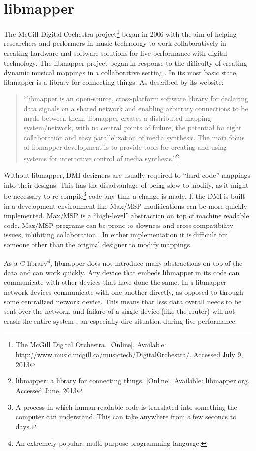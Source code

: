 
\chapter{libmapper}

The McGill Digital Orchestra project\footnote{The McGill Digital Orchestra. [Online]. Available: \url{http://www.music.mcgill.ca/musictech/DigitalOrchestra/}. Accessed July 9, 2013} began in 2006 with the aim of helping researchers and performers in music technology to work collaboratively in creating hardware and software solutions for live performance with digital technology. The libmapper project began in response to the difficulty of creating dynamic musical mappings in a collaborative setting . In its most basic state, libmapper is a library for connecting things. As described by its website: 

\begin{quote} 
``libmapper is an open-source, cross-platform software library for declaring data signals on a shared network and enabling arbitrary connections to be made between them. libmapper creates a distributed mapping system/network, with no central points of failure, the potential for tight collaboration and easy parallelization of media synthesis. The main focus of libmapper development is to provide tools for creating and using systems for interactive control of media synthesis.''\footnote{libmapper: a library for connecting things. [Online]. Available: \url{libmapper.org}. Accessed June, 2013}
\end{quote}

Without libmapper, DMI designers are usually required to ``hard-code'' mappings into their designs. This has the disadvantage of being slow to modify, as it might be necessary to re-compile\footnote{A process in which human-readable code is translated into something the computer can understand. This can take anywhere from a few seconds to days.} code any time a change is made. If the DMI is built in a development environment like Max/MSP modifications can be more quickly implemented. Max/MSP is a ``high-level'' abstraction on top of machine readable code. Max/MSP programs can be prone to slowness and cross-compatibility issues, inhibiting collaboration . In either implementation it is difficult for someone other than the original designer to modify mappings.

As a C library\footnote{An extremely popular, multi-purpose programming language.}, libmapper does not introduce many abstractions on top of the data and can work quickly. Any device that embeds libmapper in its code can communicate with other devices that have done the same. In a libmapper network devices communicate with one another directly, as opposed to through some centralized network device. This means that less data overall needs to be sent over the network, and failure of a single device (like the router) will not crash the entire system , an especially dire situation during live performance.

